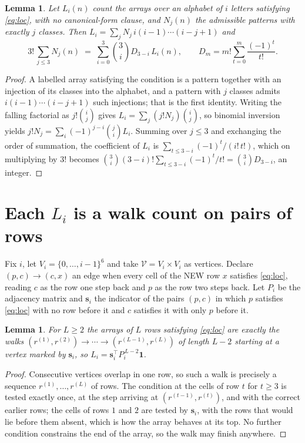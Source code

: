 \documentclass[11pt,a4paper]{article}
\theoremstyle{plain}
\newtheorem{lemma}[theorem]{Lemma}
\theoremstyle{definition}
\begin{document}
\begin{lemma}\label{lem:inv}
Let $L_i(n)$ count the arrays over an alphabet of $i$ letters satisfying \eqref{eq:loc},
with no canonical-form clause, and $N_j(n)$ the admissible patterns with exactly $j$ classes.
Then $L_i=\sum_j N_j\,i(i-1)\cdots(i-j+1)$ and
\[
3!\,\sum_{j\le 3}N_j(n)\;=\;\sum_{i=0}^{3}\binom{3}{i}D_{3-i}\,L_i(n),
\qquad D_m=m!\sum_{t=0}^{m}\frac{(-1)^t}{t!} .
\]
\end{lemma}

\begin{proof}
A labelled array satisfying the condition is a pattern together with an injection of its
classes into the alphabet, and a pattern with $j$ classes admits $i(i-1)\cdots(i-j+1)$ such
injections; that is the first identity. Writing the falling factorial as $j!\binom{i}{j}$
gives $L_i=\sum_j(j!N_j)\binom{i}{j}$, so binomial inversion yields
$j!N_j=\sum_i(-1)^{j-i}\binom{j}{i}L_i$. Summing over $j\le3$ and exchanging the
order of summation, the coefficient of $L_i$ is $\sum_{t\le3-i}(-1)^t/(i!\,t!)$, which on
multiplying by $3!$ becomes
$\binom{3}{i}(3-i)!\sum_{t\le3-i}(-1)^t/t!=\binom{3}{i}D_{3-i}$, an
integer.
\end{proof}

\section{Each $L_i$ is a walk count on pairs of rows}

Fix $i$, let $V_i=\{0,\dots,i-1\}^{6}$ and take $\mathcal V=V_i\times V_i$ as vertices.
Declare $(p,c)\to(c,x)$ an edge when every cell of the NEW row $x$ satisfies
\eqref{eq:loc}, reading $c$ as the row one step back and $p$ as the row two steps
back. Let $P_i$ be the adjacency matrix and $\mathbf{s}_i$ the indicator of the pairs
$(p,c)$ in which $p$ satisfies \eqref{eq:loc} with no row before it and $c$ satisfies it
with only $p$ before it.

\begin{lemma}\label{lem:walk}
For $L\ge2$ the arrays of $L$ rows satisfying \eqref{eq:loc} are exactly the walks
$(r^{(1)},r^{(2)})\to\cdots\to(r^{(L-1)},r^{(L)})$ of length $L-2$ starting at a
vertex marked by $\mathbf{s}_i$, so
$L_i=\mathbf{s}_i^{\!\top}P_i^{\,L-2}\mathbf{1}$.
\end{lemma}

\begin{proof}
Consecutive vertices overlap in one row, so such a walk is precisely a sequence
$r^{(1)},\dots,r^{(L)}$ of rows. The condition at the cells of row $t$ for $t\ge3$
is tested exactly once, at the step arriving at $(r^{(t-1)},r^{(t)})$, and with the
correct earlier rows; the cells of rows $1$ and $2$ are tested by $\mathbf{s}_i$, with
the rows that would lie before them absent, which is how the array behaves at its top. No
further condition constrains the end of the array, so the walk may finish anywhere.
\end{proof}
\end{document}
